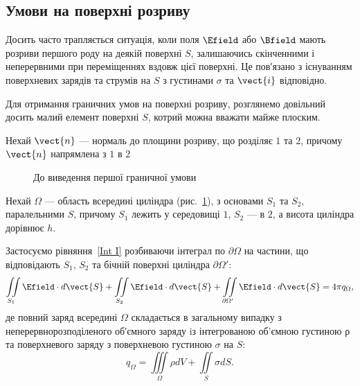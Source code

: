 \subsection*{Умови на поверхні розриву}


Досить часто трапляється ситуація, коли поля $\Efield$ або $\Bfield$ мають розриви
першого роду на деякій поверхні $S$, залишаючись скінченними і неперервними
при переміщеннях вздовж цієї поверхні. Це пов′язано з існуванням
поверхневих зарядів та струмів на $S$ з густинами $\sigma$ та $\vect{i}$ відповідно.

Для отримання граничних умов на поверхні розриву, розглянемо довільний
досить малий елемент поверхні $S$, котрий можна вважати майже плоским.

Нехай $\vect{n}$ --- нормаль до площини розриву, що розділяє $1$ та $2$, причому
$\vect{n}$ напрямлена з $1$ в $2$

\begin{figure}
	\centering
	\caption{До виведення першої граничної умови}%
	\label{tikz:bc1}
\end{figure}

Нехай $\Omega$ --- область всередині циліндра
(рис.~\ref{tikz:bc1}), з основами $S_1$ та $S_2$,
паралельними $S$, причому $S_1$ лежить у
середовищі $1$, $S_2$ --- в $2$, а висота циліндра дорівнює $h$.

Застосуємо рівняння~\eqref{Int I} розбиваючи інтеграл по $\partial\Omega$ на частини, що відповідають $S_1$, $S_2$ та бічній поверхні
циліндра $\partial\Omega'$:
\begin{equation*}
	\iint\limits_{S_1} \Efield\cdot d\vect{S} +  \iint\limits_{S_2} \Efield\cdot d\vect{S} + \iint\limits_{\partial\Omega'} \Efield\cdot
	d\vect{S} = 4\pi q_{\Omega},
\end{equation*}
де повний заряд всередині $\Omega$ складається в загальному випадку з неперервнорозподіленого об′ємного заряду iз інтегрованою об’ємною
густиною ρ та поверхневого заряду з поверхневою густиною $\sigma$ на $S$:
\begin{equation*}
	q_{\Omega} = \iiint\limits_{\Omega} \rho dV + \iint\limits_S \sigma dS.
\end{equation*}


